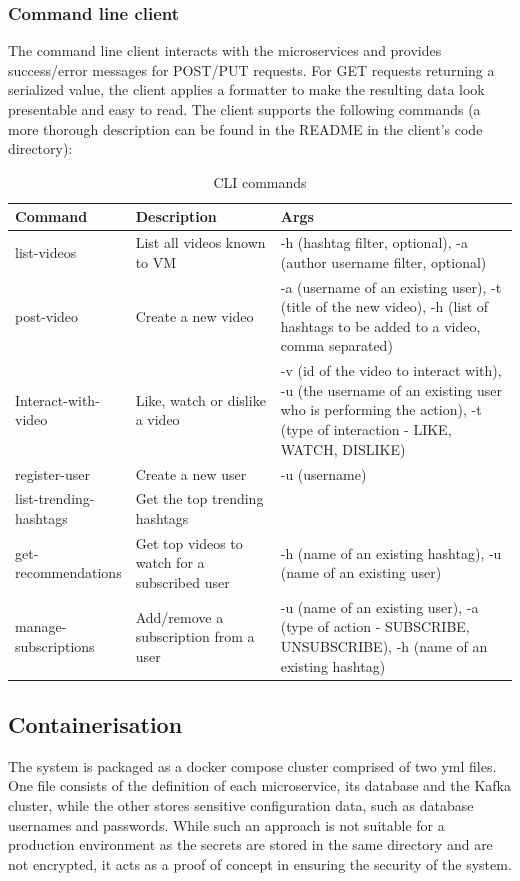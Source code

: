 \documentclass[parskip=full]{article}
\begin{document}
    \subsubsection{Command line client}
    The command line client interacts with the microservices and provides success/error messages for POST/PUT requests.
    For GET requests returning a serialized value, the client applies a formatter to make the resulting data look presentable and easy to read.
    The client supports the following commands (a more thorough description can be found in the README in the client's code directory):

    \begin{table}[h]
        \centering
        \begin{tabular}{|p{0.2\linewidth}|p{0.3\linewidth}|p{0.5\linewidth}|}
            \toprule
            \textbf{Command} & \textbf{Description} & \textbf{Args} \\
            \midrule
            list-videos & List all videos known to VM & -h (hashtag filter, optional), -a (author username filter, optional) \\
            post-video & Create a new video & -a (username of an existing user), -t (title of the new video), -h (list of hashtags to be added to a video, comma separated) \\
            Interact-with-video & Like, watch or dislike a video & -v (id of the video to interact with), -u (the username of an existing user who is performing the action), -t (type of interaction - LIKE, WATCH, DISLIKE) \\
            register-user & Create a new user & -u (username) \\
            list-trending-hashtags & Get the top trending hashtags &  \\
            get-recommendations & Get top videos to watch for a subscribed user & -h (name of an existing hashtag), -u (name of an existing user) \\
            manage-subscriptions & Add/remove a subscription from a user & -u (name of an existing user), -a (type of action - SUBSCRIBE, UNSUBSCRIBE), -h (name of an existing hashtag) \\
            \bottomrule
        \end{tabular}
        \caption{CLI commands}
        \label{tab:cli-commands}
    \end{table}


    \pagebreak
    \subsection{Containerisation}
    The system is packaged as a docker compose cluster comprised of two yml files.
    One file consists of the definition of each microservice, its database and the Kafka cluster, while the other stores sensitive configuration data, such as database usernames and passwords.
    While such an approach is not suitable for a production environment as the secrets are stored in the same directory and are not encrypted, it acts as a proof of concept in ensuring the security of the system.
\end{document}
